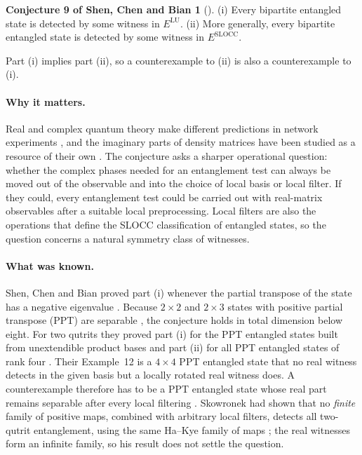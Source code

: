 \documentclass[11pt,a4paper]{article}
\theoremstyle{definition}\newtheorem{definition}[theorem]{Definition}\newtheorem*{conj}{Conjecture 9 of Shen, Chen and Bian}\newtheorem{remark}[theorem]{Remark}
\begin{document}
\begin{conj}[{\cite[Conjecture 9]{shen}}]
(i) Every bipartite entangled state is detected by some witness in $E^{\mathrm{LU}}$. (ii) More generally, every bipartite entangled state is detected by some witness in $E^{\mathrm{SLOCC}}$.
\end{conj}
Part (i) implies part (ii), so a counterexample to (ii) is also a counterexample to (i).

\paragraph{Why it matters.}
Real and complex quantum theory make different predictions in network experiments \cite{renou}, and the imaginary parts of density matrices have been studied as a resource of their own \cite{hickey}. The conjecture asks a sharper operational question: whether the complex phases needed for an entanglement test can always be moved out of the observable and into the choice of local basis or local filter. If they could, every entanglement test could be carried out with real-matrix observables after a suitable local preprocessing. Local filters are also the operations that define the SLOCC classification of entangled states, so the question concerns a natural symmetry class of witnesses.

\paragraph{What was known.}
Shen, Chen and Bian proved part (i) whenever the partial transpose of the state has a negative eigenvalue \cite[Lemma 10(i)]{shen}. Because $2\times2$ and $2\times3$ states with positive partial transpose (PPT) are separable \cite{horodecki}, the conjecture holds in total dimension below eight. For two qutrits they proved part (i) for the PPT entangled states built from unextendible product bases and part (ii) for all PPT entangled states of rank four \cite[Theorem 11]{shen}. Their Example~12 is a $4\times4$ PPT entangled state that no real witness detects in the given basis but a locally rotated real witness does. A counterexample therefore has to be a PPT entangled state whose real part remains separable after every local filtering \cite[Lemma 10(ii) and its SLOCC version]{shen}. Skowronek had shown that no \emph{finite} family of positive maps, combined with arbitrary local filters, detects all two-qutrit entanglement, using the same Ha--Kye family of maps \cite{skowronek}; the real witnesses form an infinite family, so his result does not settle the question.
\end{document}
